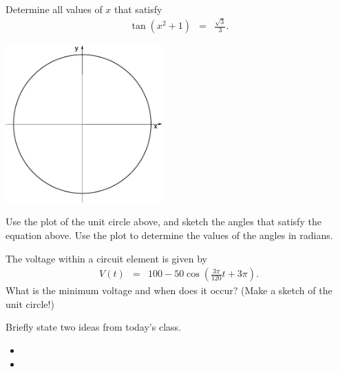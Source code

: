 \begin{problem}
  \clearpage

\item Determine all values of $x$ that satisfy 
  \begin{eqnarray*}
    \tan(x^2+1) & = & \frac{\sqrt{3}}{3}.
  \end{eqnarray*}

  \includegraphics[width=6cm]{trig/img/blankCircle}

  Use the plot of the unit circle above, and sketch the angles that
  satisfy the equation above. Use the plot to determine the values of
  the angles in radians.

  \vfill

  \clearpage

\item The voltage within a circuit element is given by
  \begin{eqnarray*}
    V(t) & = & 100-50\cos\left( \frac{3\pi}{120} t + 3\pi \right).
  \end{eqnarray*}
  What is the minimum voltage and when does it occur? (Make a sketch
  of the unit circle!)

  \vfill
  
\end{problem}

\postClass

\begin{problem}
\item Briefly state two ideas from today's class.
  \begin{itemize}
  \item 
  \item 
  \end{itemize}
\item 
  \begin{subproblem}
    \item
  \end{subproblem}
\end{problem}



